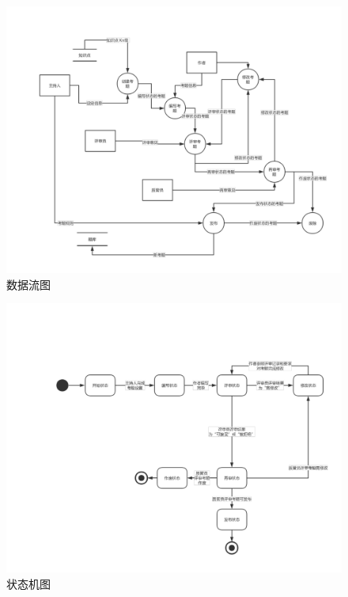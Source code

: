 \documentclass[hyperref, a4paper]{ctexart}
\begin{document}
\begin{figure}
  \centering
  \includegraphics[scale=0.33]{./assets/dataflow_diagram.pdf}
  \caption{数据流图}\label{2}
\end{figure}

\begin{figure}
  \centering
  \includegraphics[scale=0.33]{./assets/status_diagram.pdf}
  \caption{状态机图}\label{3}
\end{figure}
\end{document}
